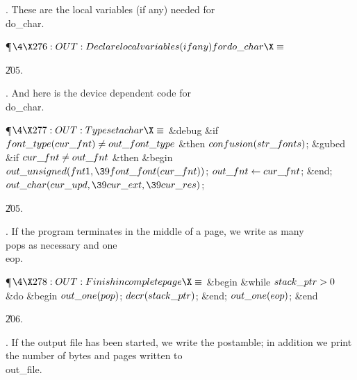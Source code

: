 . These are the local variables (if any) needed for \\{do\_char}.

\Y\P$\4\X276:OUT: Declare local variables (if any) for \\{do\_char}\X\S$\par
\U205.\fi

. And here is the device dependent code for \\{do\_char}.

\Y\P$\4\X277:OUT: Typeset a \\{char}\X\S$\6
\&{debug} \&{if} $\\{font\_type}(\\{cur\_fnt})\ne\\{out\_font\_type}$ \1%
\&{then}\5
$\\{confusion}(\\{str\_fonts})$;\2\6
\&{gubed}\6
\&{if} $\\{cur\_fnt}\ne\\{out\_fnt}$ \1\&{then}\6
\&{begin} $\\{out\_unsigned}(\\{fnt1},\39\\{font\_font}(\\{cur\_fnt}))$;\5
$\\{out\_fnt}\gets\\{cur\_fnt}$;\6
\&{end};\2\6
$\\{out\_char}(\\{cur\_upd},\39\\{cur\_ext},\39\\{cur\_res})$;\par
\U205.\fi

. If the program terminates in the middle of a page, we write as many
\\{pop}s as necessary and one \\{eop}.

\Y\P$\4\X278:OUT: Finish incomplete page\X\S$\6
\&{begin} \&{while} $\\{stack\_ptr}>0$ \1\&{do}\6
\&{begin} $\\{out\_one}(\\{pop})$;\5
$\\{decr}(\\{stack\_ptr})$;\6
\&{end};\2\6
$\\{out\_one}(\\{eop})$;\6
\&{end}\par
\U206.\fi

. If the output file has been started, we write the postamble; in
addition we print the number of bytes and pages written to \\{out\_file}.

